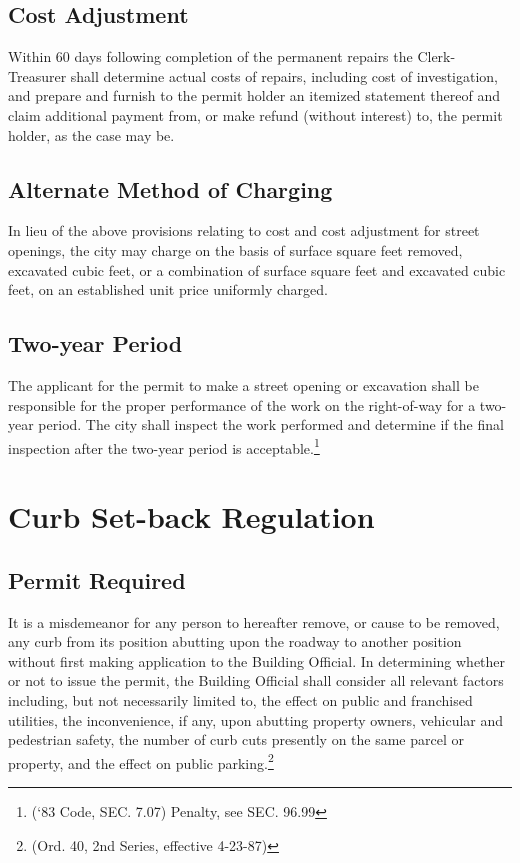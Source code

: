 \subsection{Cost Adjustment}
Within 60 days following completion of the permanent repairs the Clerk-Treasurer shall determine actual costs of repairs, including cost of investigation, and prepare and furnish to the permit holder an itemized statement thereof and claim additional payment from, or make refund (without interest) to, the permit holder, as the case may be.
\subsection{Alternate Method of Charging}
In lieu of the above provisions relating to cost and cost adjustment for street openings, the city may charge on the basis of surface square feet removed, excavated cubic feet, or a combination of surface square feet and excavated cubic feet, on an established unit price uniformly charged.
\subsection{Two-year Period}
The applicant for the permit to make a street opening or excavation shall be responsible for the proper performance of the work on the right-of-way for a two-year period.  The city shall inspect the work performed and determine if the final inspection after the two-year period is acceptable.\footnote{(‘83 Code, SEC. 7.07)  Penalty, see SEC. 96.99}
\section{Curb Set-back Regulation}
\subsection{Permit Required}
It is a misdemeanor for any person to hereafter remove, or cause to be removed, any curb from its position abutting upon the roadway to another position without first making application to the Building Official.  In determining whether or not to issue the permit, the Building Official shall consider all relevant factors including, but not necessarily limited to, the effect on public and franchised utilities, the inconvenience, if any, upon abutting property owners, vehicular and pedestrian safety, the number of curb cuts presently on the same parcel or property, and the effect on public parking.\footnote{(Ord. 40, 2nd Series, effective 4-23-87)}
